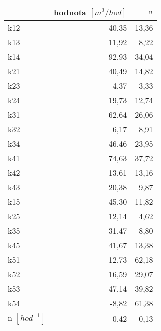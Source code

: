\begin{tabular}{lrr}
\toprule
{} &  hodnota $\left[\si{m^3/hod}\right]$ &  $\sigma$ \\
\midrule
k12                 &                                40,35 &     13,36 \\
k13                 &                                11,92 &      8,22 \\
k14                 &                                92,93 &     34,04 \\
k21                 &                                40,49 &     14,82 \\
k23                 &                                 4,37 &      3,33 \\
k24                 &                                19,73 &     12,74 \\
k31                 &                                62,64 &     26,06 \\
k32                 &                                 6,17 &      8,91 \\
k34                 &                                46,46 &     23,95 \\
k41                 &                                74,63 &     37,72 \\
k42                 &                                13,61 &     13,16 \\
k43                 &                                20,38 &      9,87 \\
k15                 &                                45,30 &     11,82 \\
k25                 &                                12,14 &      4,62 \\
k35                 &                               -31,47 &      8,80 \\
k45                 &                                41,67 &     13,38 \\
k51                 &                                12,73 &     62,18 \\
k52                 &                                16,59 &     29,07 \\
k53                 &                                47,14 &     39,82 \\
k54                 &                                -8,82 &     61,38 \\
n $[\si{hod^{-1}}]$ &                                 0,42 &      0,13 \\
\bottomrule
\end{tabular}
